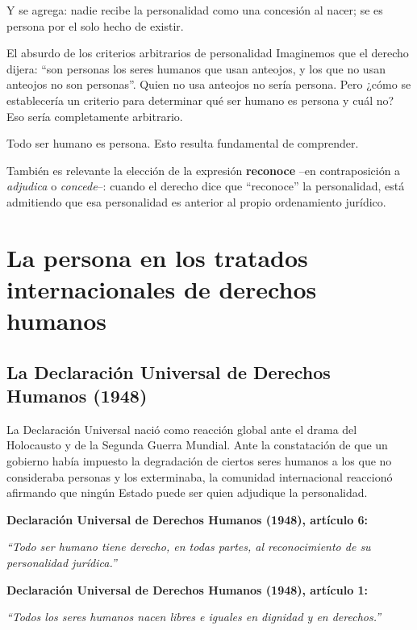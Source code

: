 \documentclass[12pt,oneside]{book}
\begin{document}
Y se agrega: nadie recibe la personalidad como una concesión al nacer; se es persona por el solo hecho de existir.

\begin{example}{El absurdo de los criterios arbitrarios de personalidad}
Imaginemos que el derecho dijera: ``son personas los seres humanos que usan anteojos, y los que no usan anteojos no son personas''. Quien no usa anteojos no sería persona. Pero ¿cómo se establecería un criterio para determinar qué ser humano es persona y cuál no? Eso sería completamente arbitrario.

Todo ser humano es persona. Esto resulta fundamental de comprender.
\end{example}

También es relevante la elección de la expresión \textbf{reconoce} --en contraposición a \emph{adjudica} o \emph{concede}--: cuando el derecho dice que ``reconoce'' la personalidad, está admitiendo que esa personalidad es anterior al propio ordenamiento jurídico.

\chapter{La persona en los tratados internacionales de derechos humanos}

\section{La Declaración Universal de Derechos Humanos (1948)}

La Declaración Universal nació como reacción global ante el drama del Holocausto y de la Segunda Guerra Mundial. Ante la constatación de que un gobierno había impuesto la degradación de ciertos seres humanos a los que no consideraba personas y los exterminaba, la comunidad internacional reaccionó afirmando que ningún Estado puede ser quien adjudique la personalidad.

\begin{important}
\textbf{Declaración Universal de Derechos Humanos (1948), artículo 6:}

\textit{``Todo ser humano tiene derecho, en todas partes, al reconocimiento de su personalidad jurídica.''}

\textbf{Declaración Universal de Derechos Humanos (1948), artículo 1:}

\textit{``Todos los seres humanos nacen libres e iguales en dignidad y en derechos.''}
\end{important}
\end{document}
